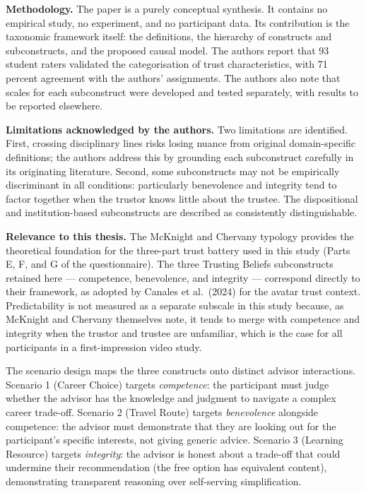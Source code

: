 \documentclass[11pt, a4paper]{article}
\begin{document}
\textbf{Methodology.} The paper is a purely conceptual synthesis. It contains no empirical study, no experiment, and no participant data. Its contribution is the taxonomic framework itself: the definitions, the hierarchy of constructs and subconstructs, and the proposed causal model. The authors report that 93 student raters validated the categorisation of trust characteristics, with 71 percent agreement with the authors' assignments. The authors also note that scales for each subconstruct were developed and tested separately, with results to be reported elsewhere.

\textbf{Limitations acknowledged by the authors.} Two limitations are identified. First, crossing disciplinary lines risks losing nuance from original domain-specific definitions; the authors address this by grounding each subconstruct carefully in its originating literature. Second, some subconstructs may not be empirically discriminant in all conditions: particularly benevolence and integrity tend to factor together when the trustor knows little about the trustee. The dispositional and institution-based subconstructs are described as consistently distinguishable.

\textbf{Relevance to this thesis.} The McKnight and Chervany typology provides the theoretical foundation for the three-part trust battery used in this study (Parts E, F, and G of the questionnaire). The three Trusting Beliefs subconstructs retained here --- competence, benevolence, and integrity --- correspond directly to their framework, as adopted by Canales et al.\ (2024) for the avatar trust context. Predictability is not measured as a separate subscale in this study because, as McKnight and Chervany themselves note, it tends to merge with competence and integrity when the trustor and trustee are unfamiliar, which is the case for all participants in a first-impression video study.

The scenario design maps the three constructs onto distinct advisor interactions. Scenario 1 (Career Choice) targets \textit{competence}: the participant must judge whether the advisor has the knowledge and judgment to navigate a complex career trade-off. Scenario 2 (Travel Route) targets \textit{benevolence} alongside competence: the advisor must demonstrate that they are looking out for the participant's specific interests, not giving generic advice. Scenario 3 (Learning Resource) targets \textit{integrity}: the advisor is honest about a trade-off that could undermine their recommendation (the free option has equivalent content), demonstrating transparent reasoning over self-serving simplification.
\end{document}

